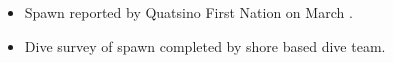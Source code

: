 \begin{itemize}
\item Spawn reported by Quatsino First Nation on March .
\item Dive survey of spawn completed by shore based dive team.
\end{itemize}